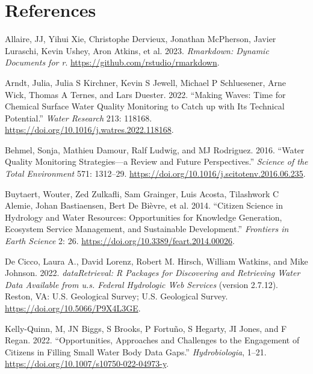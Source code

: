 \hypertarget{references}{%
\section*{References}\label{references}}

\hypertarget{refs}{}
\begin{CSLReferences}{1}{0}
\leavevmode{}%
Allaire, JJ, Yihui Xie, Christophe Dervieux, Jonathan McPherson, Javier Luraschi, Kevin Ushey, Aron Atkins, et al. 2023. \emph{Rmarkdown: Dynamic Documents for r}. \url{https://github.com/rstudio/rmarkdown}.

\leavevmode{}%
Arndt, Julia, Julia S Kirchner, Kevin S Jewell, Michael P Schluesener, Arne Wick, Thomas A Ternes, and Lars Duester. 2022. {``Making Waves: Time for Chemical Surface Water Quality Monitoring to Catch up with Its Technical Potential.''} \emph{Water Research} 213: 118168. \url{https://doi.org/10.1016/j.watres.2022.118168}.

\leavevmode{}%
Behmel, Sonja, Mathieu Damour, Ralf Ludwig, and MJ Rodriguez. 2016. {``Water Quality Monitoring Strategies---a Review and Future Perspectives.''} \emph{Science of the Total Environment} 571: 1312--29. \url{https://doi.org/10.1016/j.scitotenv.2016.06.235}.

\leavevmode{}%
Buytaert, Wouter, Zed Zulkafli, Sam Grainger, Luis Acosta, Tilashwork C Alemie, Johan Bastiaensen, Bert De Bièvre, et al. 2014. {``Citizen Science in Hydrology and Water Resources: Opportunities for Knowledge Generation, Ecosystem Service Management, and Sustainable Development.''} \emph{Frontiers in Earth Science} 2: 26. \url{https://doi.org/10.3389/feart.2014.00026}.

\leavevmode{}%
De Cicco, Laura A., David Lorenz, Robert M. Hirsch, William Watkins, and Mike Johnson. 2022. \emph{dataRetrieval: R Packages for Discovering and Retrieving Water Data Available from u.s. Federal Hydrologic Web Services} (version 2.7.12). Reston, VA: U.S. Geological Survey; U.S. Geological Survey. \url{https://doi.org/10.5066/P9X4L3GE}.

\leavevmode{}%
Kelly-Quinn, M, JN Biggs, S Brooks, P Fortuño, S Hegarty, JI Jones, and F Regan. 2022. {``Opportunities, Approaches and Challenges to the Engagement of Citizens in Filling Small Water Body Data Gaps.''} \emph{Hydrobiologia}, 1--21. \url{https://doi.org/10.1007/s10750-022-04973-y}.


\end{CSLReferences}
